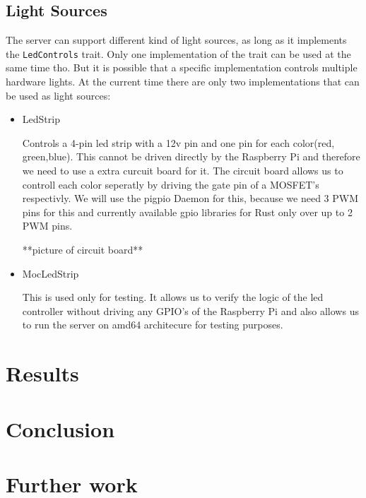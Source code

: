 \documentclass[conference]{IEEEtran}
\begin{document}
\subsection{Light Sources}

The server can support different kind of light sources, as long as it implements the \texttt{LedControls} trait.
Only one implementation of the trait can be used at the same time tho. But it is possible that a specific implementation
controls multiple hardware lights. At the current time there are only two implementations that can be used as light
sources:

\begin{itemize}
    \item LedStrip
    
    Controls a 4-pin led strip with a 12v pin and one pin for each color(red, green,blue). This cannot be driven 
    directly by the Raspberry Pi and therefore we need to use a extra curcuit board\cite{b0} for it. The circuit
    board allows us to controll each color seperatly by driving the gate pin of a MOSFET's respectivly. We will use 
    the pigpio Daemon\cite{b1} for this, because we need 3 PWM pins for this and currently available gpio libraries 
    for Rust only over up to 2 PWM pins.
    
    **picture of circuit board**

    \item MocLedStrip
    
    This is used only for testing. It allows us to verify the logic of the led controller without driving any
    GPIO's of the Raspberry Pi and also allows us to run the server on amd64 architecure for testing purposes.
\end{itemize}



\section{Results}


\section{Conclusion}


\section{Further work}








\end{document}
